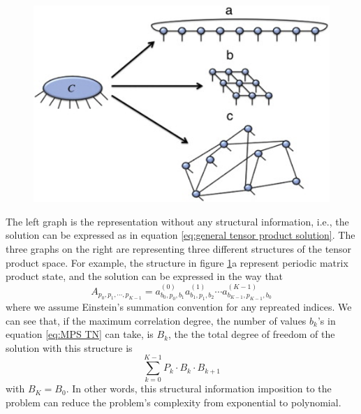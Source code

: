 \documentclass[preprint, 12pt]{revtex4-2}
\numberwithin{equation}{section}
\begin{document}
\begin{figure}[ht!]
    \centering
    \includegraphics[width=0.5\columnwidth]{figure/TN.png}
    \caption{}
    \label{fig:TN}
\end{figure}

The left graph is the representation without any structural information, i.e., the solution can be expressed as in equation \ref{eq:general tensor product solution}. The three graphs on the right are representing three different structures of the tensor product space. For example, the structure in figure \ref{fig:TN}a represent periodic matrix product state, and the solution can be expressed in the way that
\begin{equation}\label{eq:MPS TN}
    A_{p_0,p_1,\cdots,p_{K-1}} = a^{(0)}_{b_{0},p_0,b_{1}}a^{(1)}_{b_{1},p_1,b_{2}}\cdots a^{(K-1)}_{b_{K-1},p_{K-1},b_{0}}
\end{equation}
where we assume Einstein's summation convention for any repreated indices. We can see that, if the maximum correlation degree, the number of values $b_k$'s in equation \ref{eq:MPS TN} can take, is $B_k$, the the total degree of freedom of the solution with this structure is
\begin{equation}
    \sum_{k=0}^{K-1}P_k\cdot B_k \cdot B_{k+1}
\end{equation}
with $B_K=B_0$. In other words, this structural information imposition to the problem can reduce the problem's complexity from exponential to polynomial.
\end{document}
